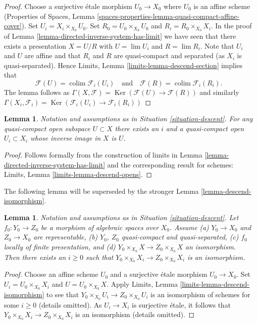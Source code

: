 \documentclass{stacks-project}
\theoremstyle{plain}
\newtheorem{lemma}[subsection]{Lemma}
\theoremstyle{definition}
\theoremstyle{remark}
\numberwithin{equation}{subsection}
\def\lim{\mathop{\mathrm{lim}}\nolimits}
\def\colim{\mathop{\mathrm{colim}}\nolimits}
\def\Ker{\mathop{\mathrm{Ker}}}
\begin{document}
\begin{proof}
Choose a surjective \'etale morphism $U_0 \to X_0$ where $U_0$ is an affine
scheme (Properties of Spaces, Lemma
\ref{spaces-properties-lemma-quasi-compact-affine-cover}).
Set $U_i = X_i \times_{X_0} U_0$.
Set $R_0 = U_0 \times_{X_0} U_0$ and $R_i = R_0 \times_{X_0} X_i$.
In the proof of Lemma \ref{lemma-directed-inverse-system-has-limit} we have
seen that there exists a presentation $X = U/R$ with
$U = \lim U_i$ and $R = \lim R_i$.
Note that $U_i$ and $U$ are affine and that $R_i$ and $R$ are
quasi-compact and separated (as $X_i$ is quasi-separated). Hence
Limits, Lemma \ref{limits-lemma-descend-section}
implies that
$$
\mathcal{F}(U) = \colim \mathcal{F}_i(U_i)
\quad\text{and}\quad
\mathcal{F}(R) = \colim \mathcal{F}_i(R_i).
$$
The lemma follows as
$\Gamma(X, \mathcal{F}) = \Ker(\mathcal{F}(U) \to \mathcal{F}(R))$
and similarly
$\Gamma(X_i, \mathcal{F}_i) =
\Ker(\mathcal{F}_i(U_i) \to \mathcal{F}_i(R_i))$
\end{proof}

\begin{lemma}
\label{lemma-descend-opens}
Notation and assumptions as in Situation \ref{situation-descent}.
For any quasi-compact open subspace $U \subset X$ there exists an $i$
and a quasi-compact open $U_i \subset X_i$ whose inverse image in $X$ is $U$.
\end{lemma}

\begin{proof}
Follows formally from the construction of limits in
Lemma \ref{lemma-directed-inverse-system-has-limit}
and the corresponding result for schemes:
Limits, Lemma \ref{limits-lemma-descend-opens}.
\end{proof}

\noindent
The following lemma will be superseded by the stronger
Lemma \ref{lemma-descend-isomorphism}.

\begin{lemma}
\label{lemma-descend-equality}
Notation and assumptions as in Situation \ref{situation-descent}.
Let $f_0 : Y_0 \to Z_0$ be a morphism of algebraic spaces over $X_0$.
Assume (a) $Y_0 \to X_0$ and $Z_0 \to X_0$ are representable, (b)
$Y_0$, $Z_0$ quasi-compact and quasi-separated, (c)
$f_0$ locally of finite presentation, and
(d) $Y_0 \times_{X_0} X \to Z_0 \times_{X_0} X$ an isomorphism.
Then there exists an $i \geq 0$ such that
$Y_0 \times_{X_0} X_i \to Z_0 \times_{X_0} X_i$ is an isomorphism.
\end{lemma}

\begin{proof}
Choose an affine scheme $U_0$ and a surjective \'etale morphism $U_0 \to X_0$.
Set $U_i = U_0 \times_{X_0} X_i$ and $U = U_0 \times_{X_0} X$.
Apply Limits, Lemma \ref{limits-lemma-descend-isomorphism}
to see that $Y_0 \times_{X_0} U_i \to Z_0 \times_{X_0} U_i$
is an isomorphism of schemes for some $i \geq 0$ (details omitted).
As $U_i \to X_i$ is surjective \'etale, it follows that
$Y_0 \times_{X_0} X_i \to Z_0 \times_{X_0} X_i$ is an isomorphism
(details omitted).
\end{proof}
\end{document}
